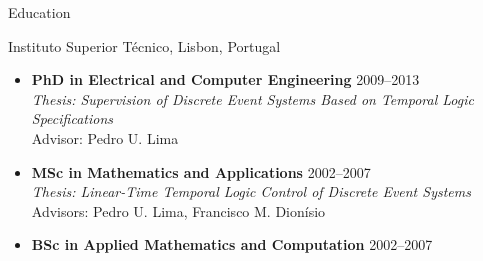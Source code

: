 
\begin{rSection}{Education}

\item Instituto Superior T\'ecnico, Lisbon, Portugal
\begin{itemize}

\item  \textbf{PhD in Electrical and Computer Engineering}  \hfill 2009--2013 \\
\textit{Thesis: Supervision of Discrete Event Systems Based on Temporal Logic Specifications} \\
Advisor: Pedro U. Lima

\item  \textbf{MSc in Mathematics and Applications }\hfill 2002--2007 \\
\textit{Thesis: Linear-Time Temporal Logic Control of Discrete Event Systems} \\
Advisors:  Pedro U. Lima,  Francisco M. Dion\'isio

\item  \textbf{BSc in Applied Mathematics and Computation}  \hfill 2002--2007 
\end{itemize}
\end{rSection}
